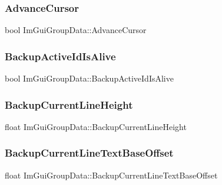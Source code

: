 \subsubsection{\texorpdfstring{Advance\+Cursor}{AdvanceCursor}}
{\footnotesize\ttfamily bool Im\+Gui\+Group\+Data\+::\+Advance\+Cursor}

\hypertarget{struct_im_gui_group_data_ac27968bcfd94ba2e4b1543b95d032f35}{}\label{struct_im_gui_group_data_ac27968bcfd94ba2e4b1543b95d032f35} 
\subsubsection{\texorpdfstring{Backup\+Active\+Id\+Is\+Alive}{BackupActiveIdIsAlive}}
{\footnotesize\ttfamily bool Im\+Gui\+Group\+Data\+::\+Backup\+Active\+Id\+Is\+Alive}

\hypertarget{struct_im_gui_group_data_a6e17deccf50138bdf436fa172bb453e2}{}\label{struct_im_gui_group_data_a6e17deccf50138bdf436fa172bb453e2} 
\subsubsection{\texorpdfstring{Backup\+Current\+Line\+Height}{BackupCurrentLineHeight}}
{\footnotesize\ttfamily float Im\+Gui\+Group\+Data\+::\+Backup\+Current\+Line\+Height}

\hypertarget{struct_im_gui_group_data_a3745219bd1f4c6ee5080d8d0aaa8a712}{}\label{struct_im_gui_group_data_a3745219bd1f4c6ee5080d8d0aaa8a712} 
\subsubsection{\texorpdfstring{Backup\+Current\+Line\+Text\+Base\+Offset}{BackupCurrentLineTextBaseOffset}}
{\footnotesize\ttfamily float Im\+Gui\+Group\+Data\+::\+Backup\+Current\+Line\+Text\+Base\+Offset}

